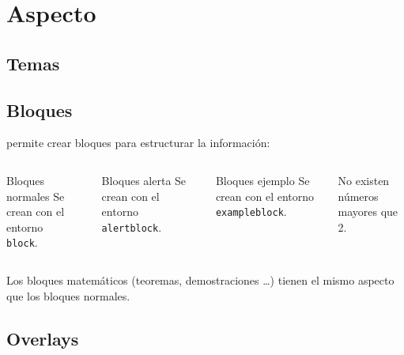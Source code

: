 \section{Aspecto}

\subsection{Temas}

\subsection{Bloques}

\begin{frame}
  \beamer permite crear bloques para estructurar la información:
  \espacio
  \begin{columns}
      \pause
      \begin{block}{Bloques normales}
        Se crean con el entorno \\ \texttt{block}.
      \end{block}

      \pause
      \begin{alertblock}{Bloques alerta}
        Se crean con el entorno \texttt{alertblock}.
      \end{alertblock}

    \pause
    \begin{exampleblock}{Bloques ejemplo}
      Se crean con el entorno \texttt{exampleblock}.
    \end{exampleblock}

    \pause
    \begin{theorem}
      No existen números mayores que 2.
    \end{theorem}

  \end{columns}

  \pause
  \espacio
  Los bloques matemáticos (teoremas, demostraciones \dots) tienen el mismo aspecto
  que los bloques normales.
\end{frame}

\subsection{Overlays}



